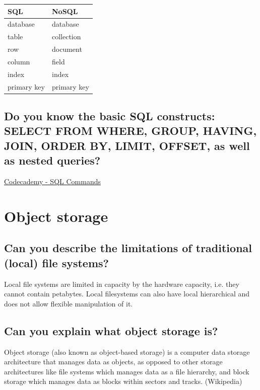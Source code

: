 \documentclass{article}
\begin{document}
\begin{table}[H]
\begin{tabular}{|l|l|}
\hline
\textbf{SQL} & \textbf{NoSQL} \\ \hline
database & database \\ \hline
table & collection \\ \hline
row & document \\ \hline
column & field \\ \hline
index & index \\ \hline
primary key & primary key \\ \hline
\end{tabular}
\end{table}

\subsection{Do you know the basic SQL constructs: SELECT FROM WHERE, GROUP, HAVING, JOIN, ORDER BY, LIMIT, OFFSET, as well as nested queries?}

\href{https://www.codecademy.com/articles/sql-commands}{Codecademy - SQL Commands}

\pagebreak

\section{Object storage}
\subsection{Can you describe the limitations of traditional (local) file systems?}

Local file systems are limited in capacity by the hardware capacity, i.e. they cannot contain petabytes. Local filesystems can also have local hierarchical and does not allow flexible manipulation of it.

\subsection{Can you explain what object storage is?}

Object storage (also known as object-based storage) is a computer data storage architecture that manages data as objects, as opposed to other storage architectures like file systems which manages data as a file hierarchy, and block storage which manages data as blocks within sectors and tracks. (Wikipedia)
\end{document}

